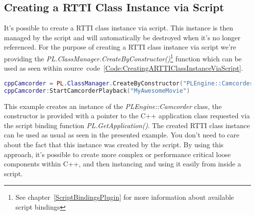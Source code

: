 \subsection{Creating a \ac{RTTI} Class Instance via Script}
It's possible to create a \ac{RTTI} class instance via script. This instance is then managed by the script and will automatically be destroyed when it's no longer referenced. For the purpose of creating a \ac{RTTI} class instance via script we're providing the \emph{PL.ClassManager.CreateByConstructor()}\footnote{See chapter~\ref{ScriptBindingsPlugin} for more information about available script bindings} function which can be used as seen within source~code~\ref{Code:CreatingARTTIClassInstanceViaScript}.
\begin{lstlisting}[language=lua,float=htb,label=Code:CreatingARTTIClassInstanceViaScript,caption={Creating a RTTI Class Instance via Script}]
cppCamcorder = PL.ClassManager.CreateByConstructor("PLEngine::Camcorder", "ParameterConstructor", "Param0=\"" .. tostring(PL.GetApplication()) .. "\"")
cppCamcorder:StartCamcorderPlayback("MyAwesomeMovie")
\end{lstlisting}
This example creates an instance of the \emph{PLEngine::Camcorder} class, the constructor is provided with a pointer to the C++ application class requested via the script binding function \emph{PL.GetApplication()}. The created \ac{RTTI} class instance can be used as usual as seen in the presented example. You don't need to care about the fact that this instance was created by the script. By using this approach, it's possible to create more complex or performance critical loose components within C++, and then instancing and using it easily from inside a script.
